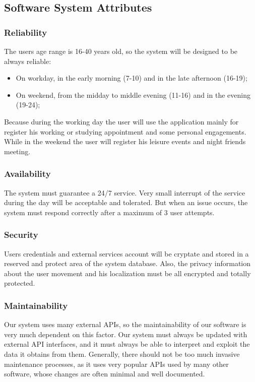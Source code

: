 \documentclass [12pt]{article}
\begin{document}
\subsection{Software System Attributes} 

\subsubsection{Reliability}
The users age range is 16-40 years old, so the system will be designed to be always reliable:
\begin{itemize}
\item On workday, in the early morning (7-10) and in the late afternoon (16-19); 
\item On weekend, from the midday to middle evening (11-16) and in the evening (19-24);
\end{itemize}
Because during the working day the user will use the application mainly for register his working or studying appointment and some personal engagements.\\
While in the weekend the user will register his leisure events and night friends meeting.

\subsubsection{Availability}
The system must guarantee a 24/7 service. Very small interrupt of the service during the day will be acceptable and tolerated. But when an issue occurs, the system must respond correctly after a maximum of 3 user attempts.
\subsubsection{Security}
Users credentials and external services account will be cryptate and stored in a reserved and protect area of the system database. Also, the privacy information about the user movement and his localization must be all encrypted and totally protected.
\subsubsection{Maintainability}
Our system uses many external APIs, so the maintainability of our software is very much dependent on this factor. Our system must always be updated with external API interfaces, and it must always be able to interpret and exploit the data it obtains from them.
Generally, there should not be too much invasive maintenance processes, as it uses very popular APIs used by many other software, whose changes are often minimal and well documented.
\end{document}
